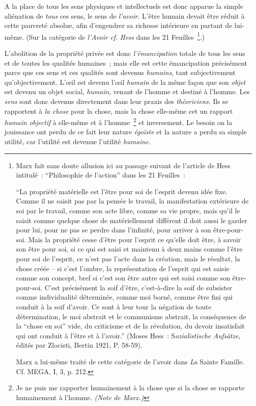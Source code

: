 \documentclass[french,twoside]{book} %
\begin{document}
A la place de tous les sens physiques et intellectuels est donc apparue la simple aliénation de \emph{tous} ces sens, le sens de \emph{l’avoir.} L’être humain devait être réduit à cette pauvreté absolue, afin d’engendrer sa richesse intérieure en partant de lui-même. (Sur la catégorie de \emph{l’Avoir cf. Hess} dans les 21 Feuilles \footnote{ \noindent Marx fait sans doute allusion ici au passage suivant de l’article de Hess intitulé : “Philosophie de l’action” dans les 21 Feuilles :\par
 “La propriété matérielle est l’être pour soi de l’esprit devenu idée fixe. Comme il ne saisit pas par la pensée le travail, la manifestation extérieure de soi par le travail, comme son acte libre, comme sa vie propre, mais qu’il le saisit comme quelque chose de matériellement différent il doit aussi le garder pour lui, pour ne pas se perdre dans l’infinité, pour arriver à son être-pour-soi. Mais la propriété cesse d’être pour l’esprit ce qu’elle doit être, à savoir son être pour soi, si ce qui est saisi et maintenu à deux mains comme l’être pour soi de l’esprit, ce n’est pas l’acte dans la création, mais le résultat, la chose créée – si c’est l’ombre, la représentation de l’esprit qui est saisie comme son concept, bref si c’est son être autre qui est saisi comme son être-pour-soi. C’est précisément la soif d’être, c’est-à-dire la soif de subsister comme individualité déterminée, comme moi borné, comme être fini qui conduit à la soif d’avoir. Ce sont à leur tour la négation de toute détermination, le moi abstrait et le communisme abstrait, la conséquence de la “chose en soi” vide, du criticisme et de la révolution, du devoir insatisfait qui ont conduit à l’être et à l’avoir.” (Moses Hess : S\emph{ozialistische Aufsätze}, édités par Zlocisti, Bertin 1921, P. 58-59).\par
 Marx a lui-même traité de cette catégorie de l’avoir dans \emph{La} Sainte Famille. Cf. MEGA, I, 3, p. 212.
}.)\par
L’abolition de la propriété privée est donc \emph{l’émancipation} totale de tous les sens et de toutes les qualités humaines ; mais elle est cette émancipation précisément parce que ces sens et ces qualités sont devenus \emph{humains}, tant subjectivement qu’objectivement. L’œil est devenu l’œil \emph{humain} de la même façon que son \emph{objet} est devenu un objet social, \emph{humain}, venant de l’homme et destiné à l’homme. Les \emph{sens} sont donc devenus directement dans leur praxis des \emph{théoriciens.} Ils se rapportent à \emph{la chose} pour la chose, mais la chose elle-même cet un rapport \emph{humain objectif} à elle-même et à l’homme \footnote{Je ne puis me rapporter humainement à la chose que si la chose se rapporte humainement à l’homme. \emph{(Note de Marx.)}} et inversement. Le besoin on la jouissance ont perdu de ce fait leur nature \emph{égoïste} et la nature a perdu sa simple utilité, car l’utilité est devenue l’utilité \emph{humaine.}\par
\end{document}
